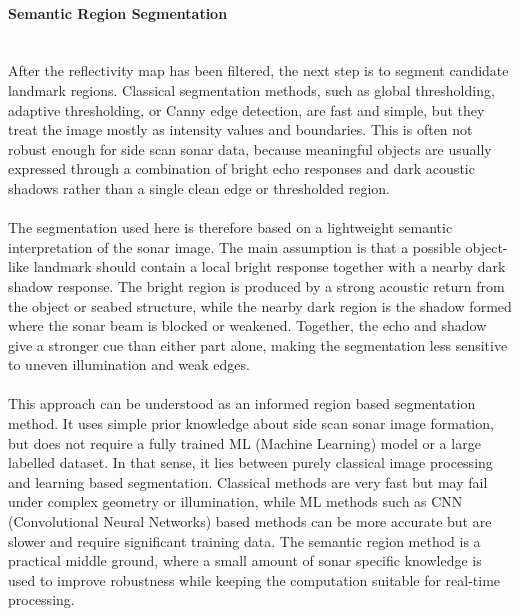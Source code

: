 \paragraph{Semantic Region Segmentation} \mbox{}\\[0.5em] \noindent
After the reflectivity map has been filtered, the next step is to segment candidate landmark regions. Classical segmentation methods, such as global thresholding, adaptive thresholding, or Canny edge detection, are fast and simple, but they treat the image mostly as intensity values and boundaries. This is often not robust enough for side scan sonar data, because meaningful objects are usually expressed through a combination of bright echo responses and dark acoustic shadows rather than a single clean edge or thresholded region.
\\ \\
The segmentation used here is therefore based on a lightweight semantic interpretation of the sonar image. The main assumption is that a possible object-like landmark should contain a local bright response together with a nearby dark shadow response. The bright region is produced by a strong acoustic return from the object or seabed structure, while the nearby dark region is the shadow formed where the sonar beam is blocked or weakened. Together, the echo and shadow give a stronger cue than either part alone, making the segmentation less sensitive to uneven illumination and weak edges.
\\ \\
This approach can be understood as an informed region based segmentation method. It uses simple prior knowledge about side scan sonar image formation, but does not require a fully trained ML (Machine Learning) model or a large labelled dataset. In that sense, it lies between purely classical image processing and learning based segmentation. Classical methods are very fast but may fail under complex geometry or illumination, while ML methods such as CNN (Convolutional Neural Networks) based methods can be more accurate but are slower and require significant training data. The semantic region method is a practical middle ground, where a small amount of sonar specific knowledge is used to improve robustness while keeping the computation suitable for real-time processing.

\newpage

